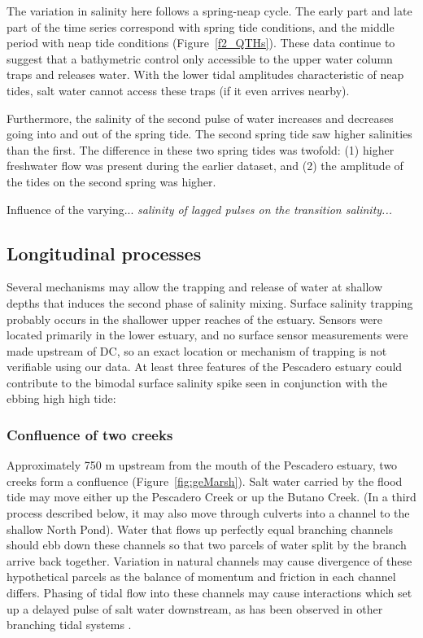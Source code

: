 The variation in salinity here follows a spring-neap cycle. The early part and late part of the time series correspond with spring tide conditions, and the middle period with neap tide conditions (Figure~\ref{f2_QTHs}). These data continue to suggest that a bathymetric control only accessible to the upper water column traps and releases water. With the lower tidal amplitudes characteristic of neap tides, salt water cannot access these traps (if it even arrives nearby).  

Furthermore, the salinity of the second pulse of water increases and decreases going into and out of the spring tide. The second spring tide saw higher salinities than the first. The difference in these two spring tides was twofold: (1) higher freshwater flow was present during the earlier dataset, and (2) the amplitude of the tides on the second spring was higher. 

Influence of the varying... \emph{salinity of lagged pulses on the transition salinity...}

\subsection{Longitudinal processes}

Several mechanisms may allow the trapping and release of water at shallow depths that induces the second phase of salinity mixing. Surface salinity trapping probably occurs in the shallower upper reaches of the estuary. Sensors were located primarily in the lower estuary, and no surface sensor measurements were made upstream of DC, so an exact location or mechanism of trapping is not verifiable using our data. At least three features of the Pescadero estuary could contribute to the bimodal surface salinity spike seen in conjunction with the ebbing high high tide:

\subsubsection{Confluence of two creeks}
Approximately 750 m upstream from the mouth of the Pescadero estuary, two creeks form a confluence (Figure~\ref{fig:geMarsh}). Salt water carried by the flood tide may move either up the Pescadero Creek or up the Butano Creek. (In a third process described below, it may also move through culverts into a channel to the shallow North Pond). Water that flows up perfectly equal branching channels should ebb down these channels so that two parcels of water split by the branch arrive back together. Variation in natural channels may cause divergence of these hypothetical parcels as the balance of momentum and friction in each channel differs. Phasing of tidal flow into these channels may cause interactions which set up a delayed pulse of salt water downstream, as has been observed in other branching tidal systems \parencite{macvean_estuarine_2011}.

